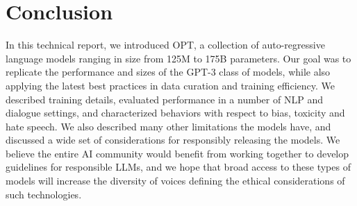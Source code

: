 \section{Conclusion}
\label{sec:conclusion}

In this technical report, we introduced OPT, a collection of auto-regressive language models ranging in size from 125M to 175B parameters. Our goal was to replicate the performance and sizes of the GPT-3 class of models, while also applying the latest best practices in data curation and training efficiency. We described training details, evaluated performance in a number of NLP and dialogue settings, and characterized behaviors with respect to bias, toxicity and hate speech. We also described many other limitations the models have, and discussed a wide set of considerations for responsibly releasing the models. We believe the entire AI community would benefit from working together to develop guidelines for responsible LLMs, and we hope that broad access to these types of models will increase the diversity of voices defining the ethical considerations of such technologies.


